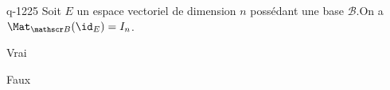 \begin{truefalse}{q-1225}
Soit $E$ un espace vectoriel de dimension $n$ possédant une base $\mathscr B$.\newline  On a $\Mat_{\mathscr B}(\id_E) = I_n$.
\item* Vrai
\item Faux
\end{truefalse}

